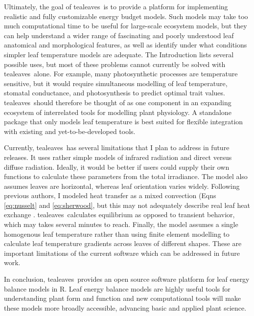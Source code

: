 \documentclass[11pt, oneside]{article}
\newcommand{\pkg}[1]{{\fontseries{b}\selectfont #1}}
\newcommand{\tealeaves}{\pkg{tealeaves}}
\begin{document}
Ultimately, the goal of \tealeaves~is to provide a platform for implementing realistic and fully customizable energy budget models. Such models may take too much computational time to be useful for large-scale ecosystem models, but they can help understand a wider range of fascinating and poorly understood leaf anatomical and morphological features, as well as identify under what conditions simpler leaf temperature models are adequate. The Introduction lists several possible uses, but most of these problems cannot currently be solved with \tealeaves~alone. For example, many photosynthetic processes are temperature sensitive, but it would require simultaneous modelling of leaf temperature, stomatal conductance, and photosynthesis to predict optimal trait values. \tealeaves~should therefore be thought of as one component in an expanding ecosystem of interrelated tools for modelling plant physiology. A standalone package that only models leaf temperature is best suited for flexible integration with existing and yet-to-be-developed tools.

Currently, \tealeaves~has several limitations that I plan to address in future releases. It uses rather simple models of infrared radiation and direct versus diffuse radiation. Ideally, it would be better if users could supply their own functions to calculate these parameters from the total irradiance. The model also assumes leaves are horizontal, whereas leaf orientation varies widely. Following previous authors, I modeled heat transfer as a mixed convection (Eqns \ref{eq:nusselt} and \ref{eq:sherwood}, but this may not adequately describe real leaf heat exchange \citep{Roth-Nebelsick_2001}. \tealeaves~calculates equilibrium as opposed to transient behavior, which may takes several minutes to reach. Finally, the model assumes a single homogenous leaf temperature rather than using finite element modelling to calculate leaf temperature gradients across leaves of different shapes. These are important limitations of the current software which can be addressed in future work.

In conclusion, \tealeaves~provides an open source software platform for leaf energy balance models in R. Leaf energy balance models are highly useful tools for understanding plant form and function and new computational tools will make these models more broadly accessible, advancing basic and applied plant science.

\end{document}
